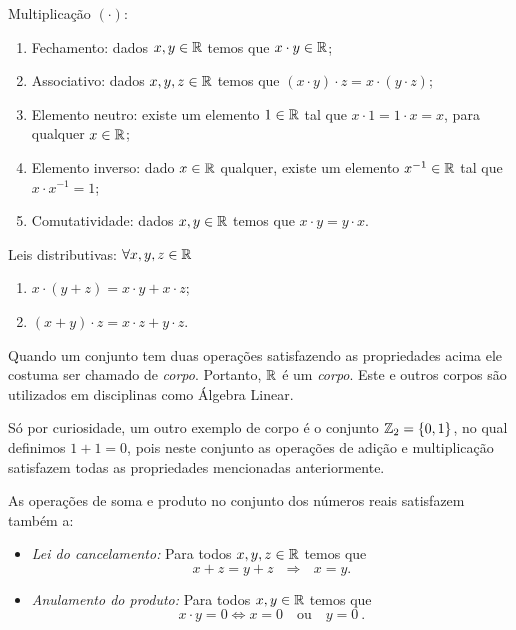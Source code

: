   Multiplicação $(\cdot)$:
 \begin{enumerate}[1)]
 \item Fechamento: dados $x, y \in \mathbb{R}$ temos que $x \cdot y \in \mathbb{R}$;
 \item Associativo: dados $x, y, z \in \mathbb{R}$ temos que $(x \cdot y) \cdot z= x \cdot (y \cdot z)$;
 \item Elemento neutro: existe um elemento $1 \in \mathbb{R}$ tal que $x \cdot 1= 1 \cdot x= x$, para qualquer $x \in \mathbb{R}$;
 \item Elemento inverso: dado $x \in \mathbb{R}$ qualquer, existe um elemento $x^{-1} \in \mathbb{R}$ tal que $x \cdot x^{-1}= 1$;
 \item Comutatividade: dados $x, y \in \mathbb{R}$ temos que $x \cdot y= y \cdot x$.
 \end{enumerate}

  Leis distributivas: $\forall x, y, z \in \mathbb{R}$
 \begin{enumerate}[1)]
 \item $x \cdot (y + z)= x \cdot y + x \cdot z$;
 \item $(x + y) \cdot z= x \cdot z + y \cdot z$.
 \end{enumerate}

   Quando um conjunto tem duas operações satisfazendo as propriedades acima ele costuma ser chamado de \emph{corpo}. Portanto, $\mathbb{R}$ é um \emph{corpo}. Este e outros corpos são utilizados em disciplinas como Álgebra Linear.

   Só por curiosidade, um outro exemplo de corpo é o conjunto $\mathbb{Z}_2= \{0, 1\}$, no qual definimos $1+1=0$, pois neste conjunto as operações de adição e multiplicação satisfazem todas as propriedades mencionadas anteriormente.

   As operações de soma e produto no conjunto dos números reais satisfazem também a:
   \begin{itemize}
   \item \textit{Lei do cancelamento:} Para todos $x, y, z \in \mathbb{R}$  temos que
    \[x+z=y+z \ \ \ \Rightarrow \ \ \ x=y  . \]
   \item \textit{Anulamento do produto:} Para todos $x, y \in \mathbb{R}$  temos que
   \[x \cdot y= 0 \Leftrightarrow x=0 \ \ \ \text{ ou } \ \ \ y=0 \ .\]
   \end{itemize}

